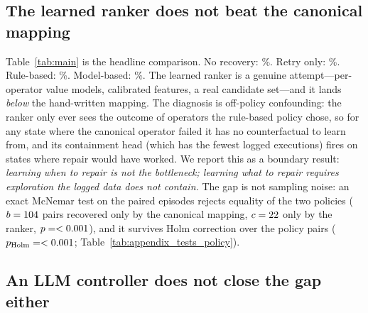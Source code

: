 \subsection{The learned ranker does not beat the canonical mapping}



Table~\ref{tab:main} is the headline comparison. No recovery: \RecNoRecovery\%. Retry only:
\RecRetry\%. Rule-based: \RecRules\%. Model-based: \RecModel\%. The learned ranker is a genuine
attempt---per-operator value models, calibrated features, a real candidate set---and it lands
\emph{below} the hand-written mapping. The diagnosis is off-policy confounding: the ranker only ever
sees the outcome of operators the rule-based policy chose, so for any state where the canonical
operator failed it has no counterfactual to learn from, and its containment head (which has the
fewest logged executions) fires on states where repair would have worked. We report this as a
boundary result: \emph{learning when to repair is not the bottleneck; learning what to repair
requires exploration the logged data does not contain.} The gap is not sampling noise: an exact
McNemar test on the \StatsPairs{} paired episodes rejects equality of the two policies
($b=104$ pairs recovered only by the canonical mapping, $c=22$ only by the
ranker, $p=<0.001$), and it survives Holm correction over the \HolmPolicyTests{} policy
pairs ($p_{\text{Holm}}=<0.001$; Table~\ref{tab:appendix_tests_policy}).

\subsection{An LLM controller does not close the gap either}



